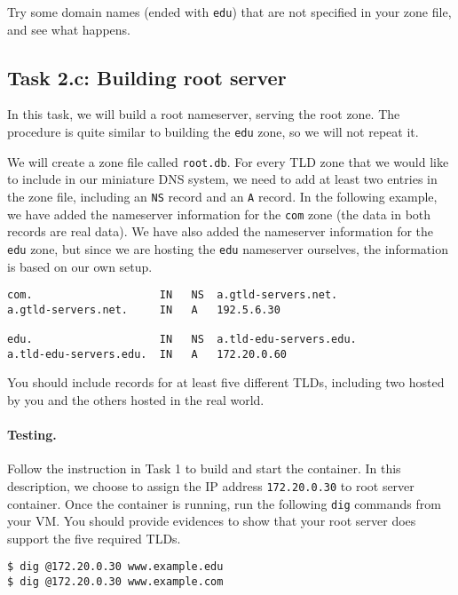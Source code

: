 Try some domain names (ended with \texttt{edu}) that are not 
specified in your zone file, and see what happens. 




\subsection{Task 2.c: Building root server}

In this task, we will build a root nameserver, serving the 
root zone. The procedure is quite similar to building
the \texttt{edu} zone, so we will not repeat it.  


We will create a zone file called \texttt{root.db}. 
For every TLD zone that we would like to include in our 
miniature DNS system, we need to add at least two entries 
in the zone file, including an \texttt{NS} record 
and an \texttt{A} record.  In the following example,
we have added the nameserver information for the 
\texttt{com} zone (the data in both records are real data).
We have also added the nameserver information 
for the \texttt{edu} zone, but since we are 
hosting the \texttt{edu} nameserver ourselves, the 
information is based on our own setup.


\begin{lstlisting}
com.                    IN   NS  a.gtld-servers.net.
a.gtld-servers.net.     IN   A   192.5.6.30

edu.                    IN   NS  a.tld-edu-servers.edu.
a.tld-edu-servers.edu.  IN   A   172.20.0.60
\end{lstlisting}
 

You should include records for at least five different TLDs, including two
hosted by you and the others hosted in the real world. 



\paragraph{Testing.} 
Follow the instruction in Task 1 to build and start the container. 
In this description, we choose to assign the 
IP address \texttt{172.20.0.30} to root server container.
Once the container is running,
run the following \texttt{dig} commands from your VM.
You should provide evidences to show that your root server does support the 
five required TLDs.

\begin{lstlisting}
$ dig @172.20.0.30 www.example.edu
$ dig @172.20.0.30 www.example.com
\end{lstlisting}


